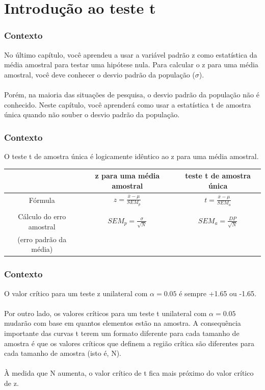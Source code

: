 \documentclass[11pt]{beamer}
\begin{document}
\section{Introdução ao teste t}
\begin{frame}
\frametitle{Contexto}
No último capítulo, você aprendeu a usar a variável padrão z como estatística da média amostral para testar uma hipótese nula. Para calcular o z para uma média amostral, você deve conhecer o desvio padrão da população ($\sigma$). \\~\\ 
  
Porém, na maioria das situações de pesquisa, o desvio padrão da população não é conhecido. Neste capítulo, você aprenderá como usar a estatística t de amostra única quando não souber o desvio padrão da população.
\end{frame}

\begin{frame}
\frametitle{Contexto}
O teste t de amostra única é logicamente idêntico ao z para uma média amostral.

\begin{center}
\small
\begin{tabular}{ccc} 
 \hline
 &	z para uma média amostral & teste t de amostra única\\
 \hline
Fórmula & $z = \frac{\bar{x}-\mu}{SEM_p}$ & $t =\frac{\bar{x}-\mu}{SEM_a}$\\
 &  & \\
Cálculo do erro amostral & $SEM_p = \frac{\sigma}{\sqrt{N}}$ & $SEM_a = \frac{DP}{\sqrt{N}}$\\
(erro padrão da média) &  & \\
 \hline
\end{tabular}
\end{center}

\end{frame}

\begin{frame}
\frametitle{Contexto}
O valor crítico para um teste z unilateral com $\alpha = 0.05$ é sempre +1.65 ou -1.65. 
\\~\\
Por outro lado, os valores críticos para um teste t unilateral com $\alpha = 0.05$ mudarão com base em quantos elementos estão na amostra. A consequência importante das curvas t terem um formato diferente para cada tamanho de amostra é que os valores críticos que definem a região crítica são diferentes para cada tamanho de amostra (isto é, N). 
\\~\\
À medida que N aumenta, o valor crítico de t fica mais próximo do valor crítico de z.
\end{frame}
\end{document}

